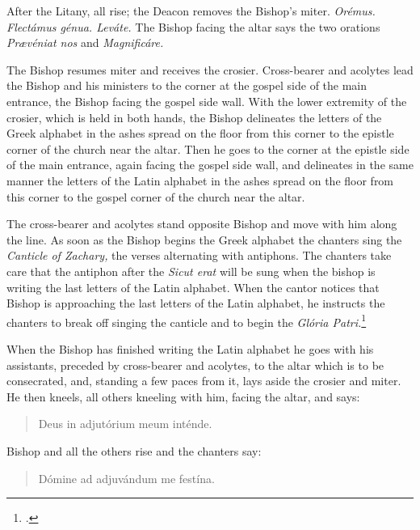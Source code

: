\documentclass[letterpaper]{report}
\begin{document}
{    \rubric After the Litany, all rise; the Deacon removes the Bishop's miter.
    \textit{Or\'emus. Flectámus génua. Leváte.} The Bishop facing the altar
    says the two orations \textit{Pr\ae véniat nos} and \textit{Magnificáre.}

    \rubric The Bishop resumes miter and receives the crosier. Cross-bearer and
    acolytes lead the Bishop and his ministers to the corner at the gospel side
    of the main entrance, the Bishop facing the gospel side wall. With the
    lower extremity of the crosier, which is held in both hands, the Bishop
    delineates the letters of the Greek alphabet in the ashes spread on the
    floor from this corner to the epistle corner of the church near the altar.
    Then he goes to the corner at the epistle side of the main entrance, again
    facing the gospel side wall, and delineates in the same manner the letters
    of the Latin alphabet in the ashes spread on the floor from this corner to
    the gospel corner of the church near the altar.

    \rubric The cross-bearer and acolytes stand opposite Bishop and move with him
    along the line. As soon as the Bishop begins the Greek alphabet the
    chanters sing the \textit{Canticle of Zachary,} the verses alternating with
    antiphons. The chanters take care that the antiphon after the \textit{Sicut
    erat} will be sung when the bishop is writing the last letters of the Latin
    alphabet. When the cantor notices that Bishop is approaching the last
    letters of the Latin alphabet, he instructs the chanters to break off
    singing the canticle and to begin the \textit{Gl\'oria
    Patri.}\footcite[][p. 56.]{consecranda}

    \rubric When the Bishop has finished writing the Latin alphabet he goes
    with his assistants, preceded by cross-bearer and acolytes, to the altar
    which is to be consecrated, and, standing a few paces from it, lays aside
    the crosier and miter. He then kneels, all others kneeling with him, facing
    the altar, and says:

    \begin{quote}
        \vbar Deus in adjutórium meum inténde.
    \end{quote}

    Bishop and all the others rise and the chanters say:

    \begin{quote}
        \rbar Dómine ad adjuvándum me festína.
    \end{quote}

}
\end{document}
